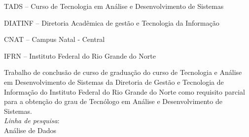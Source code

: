 
\instituicao
{
   TADS -- Curso de Tecnologia em Análise e Desenvolvimento de
   Sistemas\par 
   DIATINF -- Diretoria Acadêmica de gestão e Tecnologia da Informação\par 
   CNAT -- Campus Natal - Central\par 
   IFRN -- Instituto Federal do Rio Grande do Norte }
	
\comentario
{
	Trabalho de conclusão de curso de graduação do curso de Tecnologia e Análise em
	Desenvolvimento de Sistemas da Diretoria de Gestão e Tecnologia de Informação
	do Instituto Federal do Rio Grande do Norte como requisito parcial para a
	obtenção do grau de Tecnólogo em Análise e Desenvolvimento de
	Sistemas.\bigskip\\
   \textit{Linha de pesquisa}:\\Análise de Dados
}
		
	
\folhaderosto